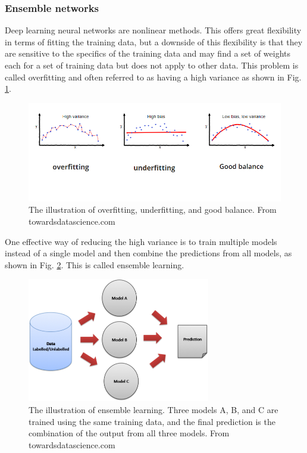 \subsubsection{Ensemble networks}
Deep learning neural networks are nonlinear methods. This offers great flexibility in terms of fitting the training data, but a downside of this flexibility is that they are sensitive to the specifics of the training data and may find a set of weights each for a set of training data but does not apply to other data. This problem is called overfitting and often referred to as having a high variance \cite{goodfellow2016deep} as shown in Fig. \ref{fig_over_under_fitting}.
\begin{figure}[h!]
\begin{center}
\includegraphics[width = 13cm]{img/over_under_fiting.png}
\caption{The illustration of overfitting, underfitting, and good balance. From towardsdatascience.com \label{fig_over_under_fitting}}
\end{center}
\end{figure}

One effective way of reducing the high variance is to train multiple models instead of a single model and then combine the predictions from all models, as shown in Fig. \ref{fig_ensemble_learning}. This is called ensemble learning.
\begin{figure}[h!]
\begin{center}
\includegraphics[width = 8cm]{img/ensemble_learning.png}
\caption{The illustration of ensemble learning. Three models A, B, and C are trained using the same training data, and the final prediction is the combination of the output from all three models. From towardsdatascience.com \label{fig_ensemble_learning}}
\end{center}
\end{figure}
